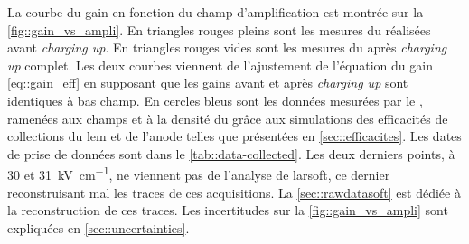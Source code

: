       La courbe du gain en fonction du champ d'amplification est montrée sur la \autoref{fig::gain_vs_ampli}. En triangles rouges pleins sont les mesures du \threeL{} réalisées avant \textit{charging up}. En triangles rouges vides sont les mesures du \threeL{} après \textit{charging up} complet. Les deux courbes viennent de l'ajustement de l'équation du gain \eqref{eq::gain_eff} en supposant que les gains avant et après \textit{charging up} sont identiques à bas champ. En cercles bleus sont les données mesurées par le \TOO{}, ramenées aux champs et à la densité du \threeL{} grâce aux simulations des efficacités de collections du \gls{lem} et de l'anode telles que présentées en \autoref{sec::efficacites}. Les dates de prise de données sont dans le \autoref{tab::data-collected}. Les deux derniers points, à 30 et \SI{31}{\kilo\volt\per\centi\meter}, ne viennent pas de l'analyse de \gls{larsoft}, ce dernier reconstruisant mal les traces de ces acquisitions. La \autoref{sec::rawdatasoft} est dédiée à la reconstruction de ces traces. %
      Les incertitudes sur la \autoref{fig::gain_vs_ampli} sont expliquées en \autoref{sec::uncertainties}.

